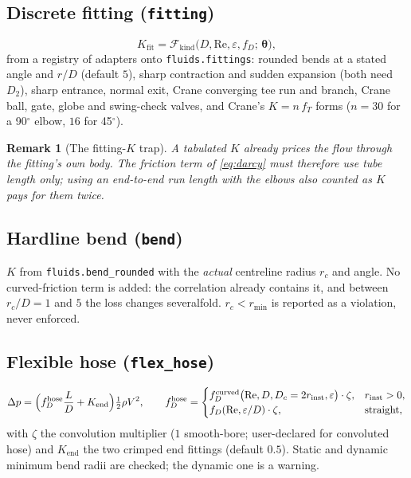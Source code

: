 \documentclass[11pt,a4paper]{article}
\newtheorem{remark}{Remark}
\newcommand{\code}[1]{\texttt{#1}}
\begin{document}
\subsection{Discrete fitting (\code{fitting})}
\begin{equation}
  K_{\mathrm{fit}} = \mathcal{F}_{\mathrm{kind}}\bigl(D,\mathrm{Re},\varepsilon,f_D;\,\boldsymbol\theta\bigr),
\end{equation}
from a registry of adapters onto \code{fluids.fittings}: rounded bends at a
stated angle and $r/D$ (default $5$), sharp contraction and sudden expansion
(both need $D_2$), sharp entrance, normal exit, Crane converging tee run and
branch, Crane ball, gate, globe and swing-check valves, and Crane's
$K = n\,f_T$ forms ($n=30$ for a 90$^\circ$ elbow, $16$ for 45$^\circ$).
\begin{remark}[The fitting-$K$ trap]
A tabulated $K$ already prices the flow through the fitting's own body. The
friction term of \cref{eq:darcy} must therefore use tube length only; using an
end-to-end run length with the elbows also counted as $K$ pays for them twice.
\end{remark}

\subsection{Hardline bend (\code{bend})}
$K$ from \code{fluids.bend\_rounded} with the \emph{actual} centreline radius
$r_c$ and angle. No curved-friction term is added: the correlation already
contains it, and between $r_c/D=1$ and $5$ the loss changes severalfold.
$r_c<r_{\min}$ is reported as a violation, never enforced.

\subsection{Flexible hose (\code{flex\_hose})}
\begin{equation}
  \Delta p = \Bigl(f_D^{\mathrm{hose}}\frac{L}{D}+K_{\mathrm{end}}\Bigr)\tfrac12\rho V^2,
  \qquad
  f_D^{\mathrm{hose}} = \begin{cases}
    f_D^{\mathrm{curved}}\bigl(\mathrm{Re},D,D_c=2r_{\mathrm{inst}},\varepsilon\bigr)\cdot\zeta, & r_{\mathrm{inst}}>0,\\
    f_D(\mathrm{Re},\varepsilon/D)\cdot\zeta, & \text{straight},
  \end{cases}
\end{equation}
with $\zeta$ the convolution multiplier ($1$ smooth-bore; user-declared for
convoluted hose) and $K_{\mathrm{end}}$ the two crimped end fittings (default
$0.5$). Static and dynamic minimum bend radii are checked; the dynamic one is
a warning.
\end{document}
